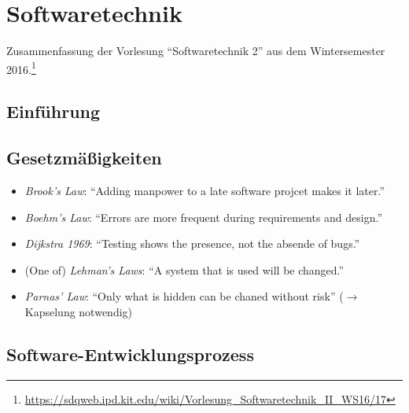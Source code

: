 \chapter{Softwaretechnik}

Zusammenfassung der Vorlesung "`Softwaretechnik 2"' aus dem Wintersemester 2016.\footnote{\url{https://sdqweb.ipd.kit.edu/wiki/Vorlesung_Softwaretechnik_II_WS16/17}}

\section{Einführung}

\section{Gesetzmäßigkeiten}
\begin{itemize}
	\item \textit{Brook's Law}: "`Adding manpower to a late software projcet makes it later."'
	\item \textit{Boehm's Law}: "`Errors are more frequent during requirements and design."'
	\item \textit{Dijkstra 1969}: "`Testing shows the presence, not the absende of bugs."'
	\item (One of) \textit{Lehman's Laws}: "`A system that is used will be changed."'
	\item \textit{Parnas' Law}: "`Only what is hidden can be chaned without risk"' (\(\rightarrow\) Kapselung notwendig)
\end{itemize}



\section{Software-Entwicklungsprozess}

